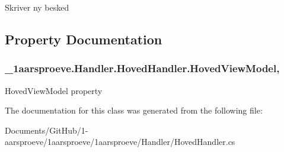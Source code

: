 Skriver ny besked 



\subsection{Property Documentation}
\hypertarget{class__1aarsproeve_1_1_handler_1_1_hoved_handler_a967641be7f28016b11d379c950e5f1a3}{}
\subsubsection[{Hoved\+View\+Model}]{ \+\_\+1aarsproeve.\+Handler.\+Hoved\+Handler.\+Hoved\+View\+Model\hspace{0.3cm}{\ttfamily [get]}, {\ttfamily [set]}}\label{class__1aarsproeve_1_1_handler_1_1_hoved_handler_a967641be7f28016b11d379c950e5f1a3}


Hoved\+View\+Model property 



The documentation for this class was generated from the following file\+:\begin{DoxyCompactItemize}
\item 
Documents/\+Git\+Hub/1-\/aarsproeve/1aarsproeve/1aarsproeve/\+Handler/Hoved\+Handler.\+cs\end{DoxyCompactItemize}
